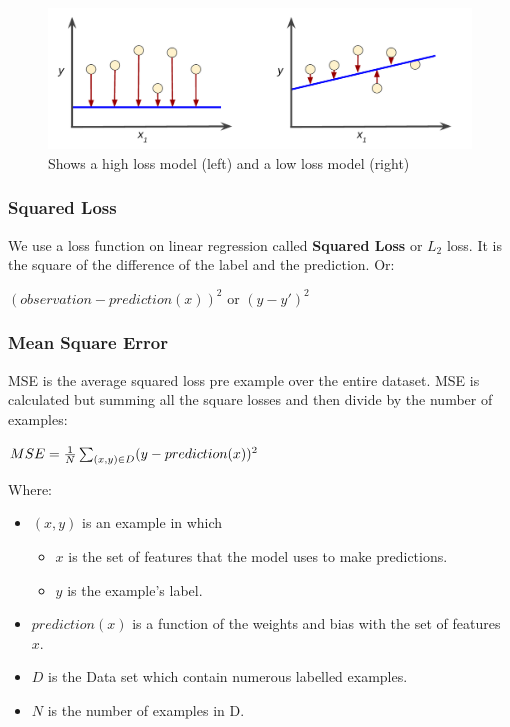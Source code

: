 \documentclass[12pt]{article}
\begin{document}
\begin{figure}[h]
\includegraphics[scale = 0.2]{imgs/LossSideBySide}
\centering
\caption{Shows a high loss model (left) and a low loss model (right)}
\end{figure}

\subsubsection{Squared Loss}
We use a loss function on linear regression called \textbf{Squared Loss} or $L_2$ loss. It is the square of the difference of the label and the prediction. Or:

\begin{center}
$(observation - prediction(x))^2$ or $(y - y')^2$
\end{center}

\subsubsection{Mean Square Error}
MSE is the average squared loss pre example over the entire dataset. MSE is calculated but summing all the square losses and then divide by the number of examples:

\begin{center}
$MSE = {{1}\over {N}} \sum_{(x,y)\in D} (y - prediction(x))^2$
\end{center}
Where:
\begin{itemize}
	\item $(x,y)$ is an example in which
	\begin{itemize}
	\item $x$ is the set of features that the model uses to make predictions.
	\item $y$ is the example's label.
	\end{itemize}
	\item $prediction(x)$ is a function of the weights and bias with the set of features $x$.
	\item $D$ is the Data set which contain numerous labelled examples.
	\item $N$ is the number of examples in D.
\end{itemize}
\end{document}
